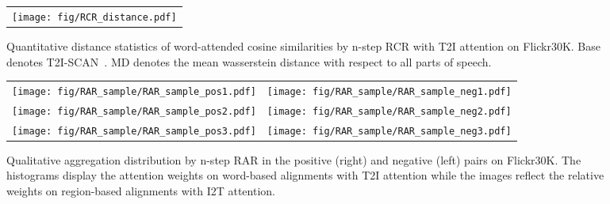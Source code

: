 \documentclass[journal]{IEEEtran}\newcommand{\ignore}[1]{}
\begin{document}
\begin{figure}[t!]
	\centering
	\begin{tabular}{@{}c}
		\texttt{[image: fig/RCR\_distance.pdf]} 
	\end{tabular}
	\caption{Quantitative distance statistics of word-attended cosine similarities by n-step RCR with T2I attention on Flickr30K. Base denotes T2I-SCAN~\cite{SCAN}. MD denotes the mean wasserstein distance with respect to all parts of speech.}
	\label{fig:RCRdistance}
\end{figure}

\begin{figure*}[ht]
	\centering
	\begin{tabular}{@{}cc}
		\texttt{[image: fig/RAR\_sample/RAR\_sample\_pos1.pdf]}
		&\texttt{[image: fig/RAR\_sample/RAR\_sample\_neg1.pdf]} \\
		\texttt{[image: fig/RAR\_sample/RAR\_sample\_pos2.pdf]}
		&\texttt{[image: fig/RAR\_sample/RAR\_sample\_neg2.pdf]} \\
		\texttt{[image: fig/RAR\_sample/RAR\_sample\_pos3.pdf]}
		&\texttt{[image: fig/RAR\_sample/RAR\_sample\_neg3.pdf]} \\
	\end{tabular}
	\caption{Qualitative aggregation distribution by n-step RAR in the positive (right) and negative (left) pairs on Flickr30K. The histograms display the attention weights on word-based alignments with T2I attention while the images reflect the relative weights on region-based alignments with I2T attention.}
	\label{fig:RARsample}
\end{figure*}
\end{document}
